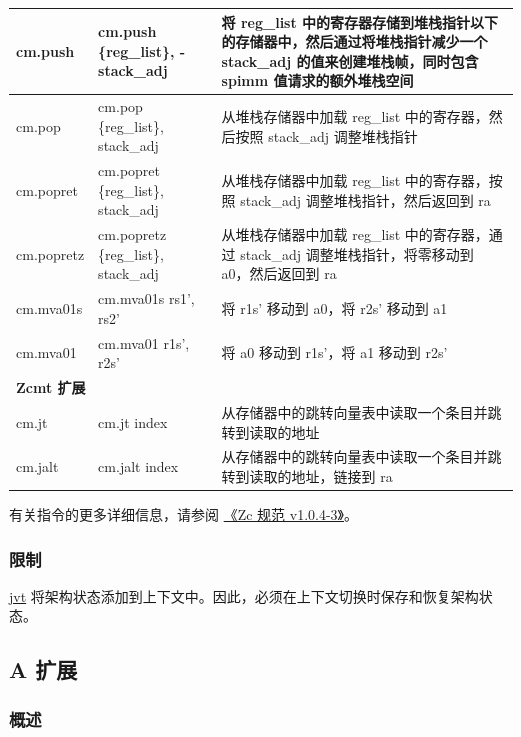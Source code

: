 \documentclass[main\_\_CN.tex]{subfiles}
\begin{document}
\begin{longtable}{ | p{2.0cm} | p{4.0cm} |  p{10.0cm} | }
cm.push & cm.push \{reg\_list\}, -stack\_adj & 将 reg\_list 中的寄存器存储到堆栈指针以下的存储器中，然后通过将堆栈指针减少一个 stack\_adj 的值来创建堆栈帧，同时包含 spimm 值请求的额外堆栈空间\\\hline
cm.pop & cm.pop \{reg\_list\}, stack\_adj & 从堆栈存储器中加载 reg\_list 中的寄存器，然后按照 stack\_adj 调整堆栈指针 \\\hline
cm.popret & cm.popret \{reg\_list\}, stack\_adj & 从堆栈存储器中加载 reg\_list 中的寄存器，按照 stack\_adj 调整堆栈指针，然后返回到 ra\\\hline
cm.popretz & cm.popretz \{reg\_list\}, stack\_adj & 从堆栈存储器中加载 reg\_list 中的寄存器，通过 stack\_adj 调整堆栈指针，将零移动到 a0，然后返回到 ra\\\hline
cm.mva01s & cm.mva01s rs1', rs2' &  将 r1s' 移动到 a0，将 r2s' 移动到 a1\\\hline
cm.mva01 & cm.mva01 r1s', r2s' & 将 a0 移动到 r1s'，将 a1 移动到 r2s' \\\hline

\multicolumn{3}{|l|}{\textbf{Zcmt 扩展}} \\\hline

cm.jt & cm.jt index & 从存储器中的跳转向量表中读取一个条目并跳转到读取的地址 \\\hline
cm.jalt & cm.jalt index & 从存储器中的跳转向量表中读取一个条目并跳转到读取的地址，链接到 ra  \\\hline

\end{longtable}

有关指令的更多详细信息，请参阅 \href{https://github.com/riscvarchive/riscv-code-size-reduction/blob/v1.0.4-3/Zc-specification/Zc.adoc}{《Zc 规范 v1.0.4-3》}。

\subsubsection{限制}
\label{sec:riscvcpu-zc-limit-descr}

\hyperref[regdesc:JVT]{jvt} 将架构状态添加到上下文中。因此，必须在上下文切换时保存和恢复架构状态。


\newpage
\subsection{A 扩展}
\label{sec:riscvcpu-atomic}

\subsubsection{概述}
\label{sec:riscvcpu-atomic-overview}
\end{document}
